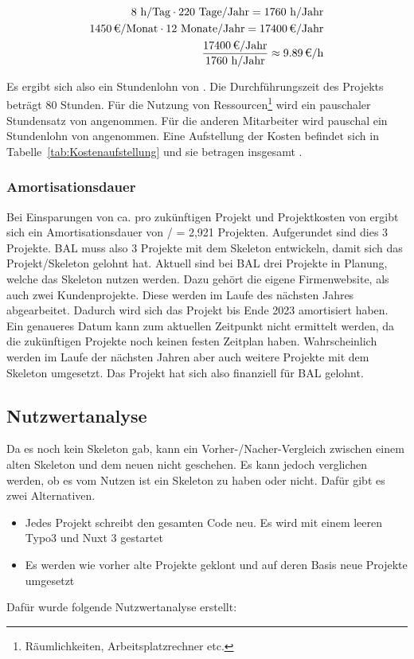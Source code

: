 \begin{eqnarray}
8 \mbox{ h/Tag} \cdot 220 \mbox{ Tage/Jahr} = 1760 \mbox{ h/Jahr}\\
\eur{1450}\mbox{/Monat} \cdot 12 \mbox{ Monate/Jahr} = \eur{17400} \mbox{/Jahr}\\
\frac{\eur{17400} \mbox{/Jahr}}{1760 \mbox{ h/Jahr}} \approx \eur{9.89}\mbox{/h}
\end{eqnarray}

Es ergibt sich also ein Stundenlohn von . 
Die Durchführungszeit des Projekts beträgt 80 Stunden. Für die Nutzung von Ressourcen\footnote{Räumlichkeiten, Arbeitsplatzrechner etc.} wird 
ein pauschaler Stundensatz von  angenommen. Für die anderen Mitarbeiter wird pauschal ein Stundenlohn von  angenommen. 
Eine Aufstellung der Kosten befindet sich in Tabelle~\ref{tab:Kostenaufstellung} und sie betragen insgesamt .


\subsubsection{Amortisationsdauer}
\label{sec:Amortisationsdauer}

Bei Einsparungen von ca.  pro zukünftigen Projekt und Projektkosten von  ergibt sich ein Amortisationsdauer von  /  = 2,921 Projekten. Aufgerundet sind dies 3 Projekte. \acs{BAL} muss also 3 Projekte mit dem Skeleton entwickeln, damit sich das Projekt/Skeleton gelohnt hat. Aktuell sind bei \acs{BAL} drei Projekte in Planung, welche das Skeleton nutzen werden. Dazu gehört die eigene Firmenwebsite, als auch zwei Kundenprojekte. Diese werden im Laufe des nächsten Jahres abgearbeitet. Dadurch wird sich das Projekt bis Ende 2023 amortisiert haben. Ein genaueres Datum kann zum aktuellen Zeitpunkt nicht ermittelt werden, da die zukünftigen Projekte noch keinen festen Zeitplan haben. Wahrscheinlich werden im Laufe der nächsten Jahren aber auch weitere Projekte mit dem Skeleton umgesetzt. Das Projekt hat sich also finanziell für \acs{BAL} gelohnt.


\subsection{Nutzwertanalyse}
\label{sec:Nutzwertanalyse}
Da es noch kein Skeleton gab, kann ein Vorher-/Nacher-Vergleich zwischen einem alten Skeleton und dem neuen nicht geschehen. Es kann jedoch verglichen werden, ob es vom Nutzen ist ein Skeleton zu haben oder nicht. Dafür gibt es zwei Alternativen.
\begin{itemize}
	\item Jedes Projekt schreibt den gesamten Code neu. Es wird mit einem leeren Typo3 und Nuxt 3 gestartet
	\item Es werden wie vorher alte Projekte geklont und auf deren Basis neue Projekte umgesetzt
\end{itemize}
Dafür wurde folgende Nutzwertanalyse erstellt: \newline

